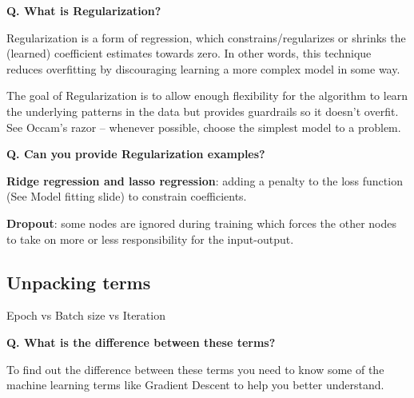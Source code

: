 \begin{frame}[fragile]{\textbf{Q. What is Regularization?}}
  \begin{wideitemize}
    \item Regularization is a form of regression, which constrains/regularizes or shrinks
    the (learned) coefficient estimates towards zero. In other words, this technique
    reduces overfitting by discouraging learning a more complex model in some way.
  \end{wideitemize}
  \begin{framed}
    The goal of Regularization is to allow enough flexibility for the algorithm
    to learn the underlying patterns in the data but provides guardrails so it
    doesn't overfit. See Occam's razor -- whenever possible, choose the simplest
    model to a problem.
  \end{framed}
\end{frame}

\begin{frame}[fragile]{\textbf{Q. Can you provide Regularization examples?}}
  \begin{wideitemize}
    \item \textbf{Ridge regression and lasso regression}: adding a penalty
    to the loss function (See Model fitting slide) to constrain coefficients.
    \item \textbf{Dropout}: some nodes are ignored during training which
    forces the other nodes to take on more or less responsibility for the
    input-output.
  \end{wideitemize}
\end{frame}

\subsection{Unpacking terms}
\begin{transitionsubframe}
  \begin{center}
    \Huge Epoch vs Batch size vs Iteration
  \end{center}
\end{transitionsubframe}

\begin{frame}[fragile]{\textbf{Q. What is the difference between these terms?}}
  \begin{wideitemize}
    \item To find out the difference between these terms you need to know some
    of the machine learning terms like Gradient Descent to help you better
    understand.
  \end{wideitemize}
\end{frame}


